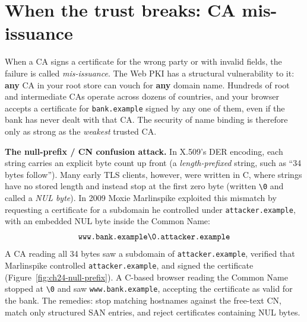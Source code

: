 \section{When the trust breaks: CA mis-issuance}
\label{ch24:misissuance}

When a CA signs a certificate for the wrong party or with invalid fields, the failure is called \emph{mis-issuance}. The Web PKI has a structural vulnerability to it: \textbf{any} CA in your root store can vouch for \textbf{any} domain name. Hundreds of root and intermediate CAs operate across dozens of countries, and your browser accepts a certificate for \texttt{bank.example} signed by any one of them, even if the bank has never dealt with that CA. The security of name binding is therefore only as strong as the \emph{weakest} trusted CA.

\begin{attackbox}
\textbf{The null-prefix / CN confusion attack.} In X.509's DER encoding, each string carries an explicit byte count up front (a \emph{length-prefixed} string, such as ``34 bytes follow''). Many early TLS clients, however, were written in C, where strings have no stored length and instead stop at the first zero byte (written \texttt{\textbackslash 0} and called a \emph{NUL byte}). In 2009 Moxie Marlinspike exploited this mismatch by requesting a certificate for a subdomain he controlled under \texttt{attacker.example}, with an embedded NUL byte inside the Common Name:
\[
\text{\texttt{www.bank.example\textbackslash 0.attacker.example}}
\]
A CA reading all 34 bytes saw a subdomain of \texttt{attacker.example}, verified that Marlinspike controlled \texttt{attacker.example}, and signed the certificate (Figure~\ref{fig:ch24-null-prefix}). A C-based browser reading the Common Name stopped at \texttt{\textbackslash 0} and saw \texttt{www.bank.example}, accepting the certificate as valid for the bank. The remedies: stop matching hostnames against the free-text CN, match only structured SAN entries, and reject certificates containing NUL bytes.
\end{attackbox}

